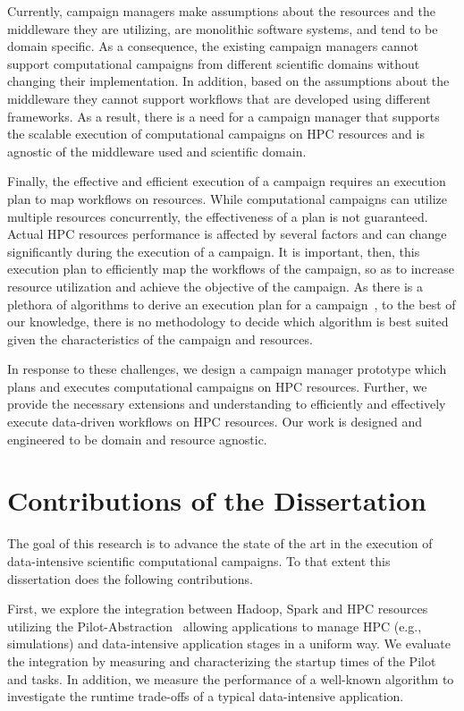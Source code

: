 Currently, campaign managers make assumptions about the resources and the 
middleware they are utilizing, are monolithic software systems, and tend to be 
domain specific. As a consequence, the existing campaign managers cannot 
support computational campaigns from different scientific domains without 
changing their implementation. In addition, based on the assumptions about the 
middleware they cannot support workflows that are developed using different 
frameworks. As a result, there is a need for a campaign manager that supports 
the scalable execution of computational campaigns on HPC resources and is 
agnostic of the middleware used and scientific domain.

Finally, the effective and efficient execution of a campaign requires an
execution plan to map workflows on resources. While computational campaigns
can utilize multiple resources concurrently, the effectiveness of a plan is
not guaranteed. Actual HPC resources performance is affected by several
factors and can change significantly during the execution of a campaign. It is
important, then, this execution plan to efficiently map the workflows of the
campaign, so as to increase resource utilization and achieve the objective of
the campaign. As there is a plethora of algorithms to derive an execution plan 
for a campaign~\cite{lu2019review}, to the best of our knowledge, there is no 
methodology to decide which algorithm is best suited given the characteristics 
of the campaign and resources.

In response to these challenges, we design a campaign manager prototype which
plans and executes computational campaigns on HPC resources. Further, we
provide the necessary extensions and understanding to efficiently and
effectively execute data-driven workflows on HPC resources. Our work is
designed and engineered to be domain and resource agnostic.

\section{Contributions of the Dissertation}

The goal of this research is to advance the state of the art in the execution
of data-intensive scientific computational campaigns. To that extent this
dissertation does the following contributions.

First, we explore the integration between Hadoop, Spark and HPC resources
utilizing the Pilot-Abstraction~\cite{luckow2012pstar} allowing applications
to manage HPC (e.g., simulations) and data-intensive application stages in a
uniform way. We evaluate the integration by measuring and characterizing the
startup times of the Pilot and tasks. In addition, we measure the performance
of a well-known  algorithm to investigate the runtime trade-offs of a typical
data-intensive application.

